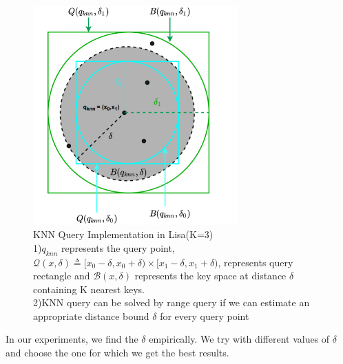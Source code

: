 \begin{figure}[t]
    \centering
    \includegraphics[width=0.7\textwidth]{graphs/KNN_Query_Lisa.png}
    \caption{KNN Query Implementation in Lisa(K=3)\\
    1)$q_{knn}$ represents the query point, $ \mathcal{Q}(x,\delta) \triangleq [x_{0}-\delta, x_{0}+\delta) \times[x_{1}-\delta, x_{1}+\delta)$, represents query rectangle and $ \mathcal{B}(x, \delta)$ represents the key space at distance $\delta$ containing K nearest keys.\\
    2)KNN query can be solved by range query if we can estimate an appropriate distance bound $\delta$ for every query point\\
    }
    \label{fig:KNN_Query_Lisa}
\end{figure}
In our experiments, we find the $\delta$ empirically. We try with different values of $\delta$ and choose the one for which we get the best results. 